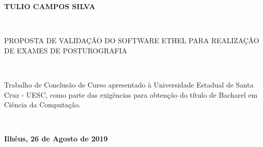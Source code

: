 
%
% 
%
\begin{folhadeaprovacao}


\begin{center}

    {\large \begin{large} \bfseries TULIO CAMPOS SILVA \end{large}\\}
    \vspace{4cm}
    {\large\bfseries{\begin{large} PROPOSTA DE VALIDAÇÃO DO SOFTWARE ETHEL PARA REALIZAÇÃO DE EXAMES DE POSTUROGRAFIA \end{large}}\\}
    \vspace{1cm}
    \hspace{.45\linewidth}
    \begin{minipage}{.50\linewidth}

            Trabalho de Conclusão de Curso apresentado à Universidade Estadual de Santa Cruz - UESC, como parte das exigências para obtenção do título de Bacharel em Ciência da Computação.
    \end{minipage}
    \\
\end{center}
    \textbf{Ilhéus, 26 de Agosto de 2019}
\begin{center}
           

    \bfseries{}
\end{center}

    \vspace{2.5cm}
    \vspace{3 cm}%

  
\end{folhadeaprovacao}
